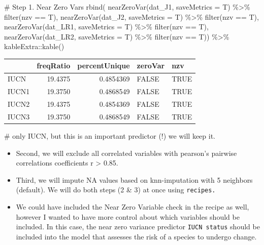 \documentclass[
  letterpaper,
  DIV=11,
  numbers=noendperiod]{scrreprt}
\newenvironment{Shaded}{\begin{snugshade}}{\end{snugshade}}
\newcommand{\AttributeTok}[1]{\textcolor[rgb]{0.40,0.45,0.13}{#1}}
\newcommand{\CommentTok}[1]{\textcolor[rgb]{0.37,0.37,0.37}{#1}}
\newcommand{\FunctionTok}[1]{\textcolor[rgb]{0.28,0.35,0.67}{#1}}
\newcommand{\NormalTok}[1]{\textcolor[rgb]{0.00,0.23,0.31}{#1}}
\newcommand{\SpecialCharTok}[1]{\textcolor[rgb]{0.37,0.37,0.37}{#1}}
\begin{document}
\begin{Shaded}
\begin{Highlighting}[]
\CommentTok{\# Step 1. Near Zero Vars}
\FunctionTok{rbind}\NormalTok{(}
\FunctionTok{nearZeroVar}\NormalTok{(dat\_J1, }\AttributeTok{saveMetrics =}\NormalTok{ T) }\SpecialCharTok{\%\textgreater{}\%} \FunctionTok{filter}\NormalTok{(nzv }\SpecialCharTok{==}\NormalTok{ T),}
\FunctionTok{nearZeroVar}\NormalTok{(dat\_J2, }\AttributeTok{saveMetrics =}\NormalTok{ T) }\SpecialCharTok{\%\textgreater{}\%} \FunctionTok{filter}\NormalTok{(nzv }\SpecialCharTok{==}\NormalTok{ T),}
\FunctionTok{nearZeroVar}\NormalTok{(dat\_LR1, }\AttributeTok{saveMetrics =}\NormalTok{ T) }\SpecialCharTok{\%\textgreater{}\%} \FunctionTok{filter}\NormalTok{(nzv }\SpecialCharTok{==}\NormalTok{ T),}
\FunctionTok{nearZeroVar}\NormalTok{(dat\_LR2, }\AttributeTok{saveMetrics =}\NormalTok{ T) }\SpecialCharTok{\%\textgreater{}\%} \FunctionTok{filter}\NormalTok{(nzv }\SpecialCharTok{==}\NormalTok{ T)) }\SpecialCharTok{\%\textgreater{}\%} 
\NormalTok{  kableExtra}\SpecialCharTok{::}\FunctionTok{kable}\NormalTok{()}
\end{Highlighting}
\end{Shaded}

\begin{longtable}[]{@{}lrrll@{}}
\toprule\noalign{}
& freqRatio & percentUnique & zeroVar & nzv \\
\midrule\noalign{}
\endhead
\bottomrule\noalign{}
\endlastfoot
IUCN & 19.4375 & 0.4854369 & FALSE & TRUE \\
IUCN1 & 19.3750 & 0.4868549 & FALSE & TRUE \\
IUCN2 & 19.4375 & 0.4854369 & FALSE & TRUE \\
IUCN3 & 19.3750 & 0.4868549 & FALSE & TRUE \\
\end{longtable}

\begin{Shaded}
\begin{Highlighting}[]
\CommentTok{\# only IUCN, but this is an important predictor (!) we will keep it.}
\end{Highlighting}
\end{Shaded}

\begin{itemize}
\item
  Second, we will exclude all correlated variables with pearson's
  pairwise correlations coefficients r \textgreater{} 0.85.
\item
  Third, we will impute NA values based on knn-imputation with 5
  neighbors (default). We will do both steps (2 \& 3) at once using
  \texttt{recipes.}
\item
  We could have included the Near Zero Variable check in the recipe as
  well, however I wanted to have more control about which variables
  should be included. In this case, the near zero variance predictor
  \texttt{IUCN\ status} should be included into the model that assesses
  the risk of a species to undergo change.
\end{itemize}
\end{document}
